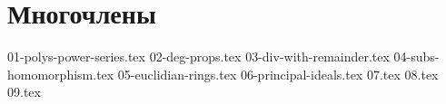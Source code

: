 \section{Многочлены}
{01-polys-power-series.tex}
{02-deg-props.tex}
{03-div-with-remainder.tex}
{04-subs-homomorphism.tex}
{05-euclidian-rings.tex}
{06-principal-ideals.tex}
{07.tex}
{08.tex}
{09.tex}
